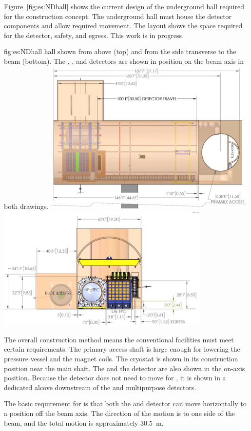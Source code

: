 Figure~\ref{fig:es:NDhall} shows the current design of the underground hall required for the   construction concept. The underground hall must house the detector components and allow required movement. The layout shows the space required for the detector, safety, and egress.  This  work is in progress. 


\begin{dunefigure}{fig:es:NDhall}
{   hall shown from above (top) and from the side transverse to the beam (bottom). The , , and  detectors are shown in position on the beam axis in both drawings. }
\includegraphics[width=0.8\textwidth]{graphics/Hall_top.jpg}
\includegraphics[width=0.8\textwidth]{graphics/Hall_side.jpg}
\end{dunefigure}

The overall construction method means the conventional facilities must meet certain requirements. 
The primary access shaft is large enough for lowering the pressure vessel and the magnet coils. The  cryostat is shown in its construction position near the main shaft. The  and the  detector are also shown in the on-axis position. Because the  detector does not need to move for , it is shown in a dedicated alcove downstream of the  and multipurpose detectors.


The basic requirement for  is that both the  and  detector can move horizontally to a position off the beam axis. The direction of the motion is to one side of the beam, and the total motion is approximately 30.5~m. 





